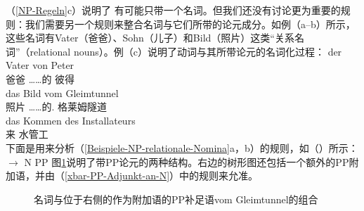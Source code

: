 （\ref{NP-Regeln}c）说明了 \nbarc 有可能只带一个名词。但我们还没有讨论更为重要的规则：我们需要另一个规则来整合名词与它们所带的论元成分。如例（a--b）所示，这些名词有Vater（爸爸）、Sohn（儿子）和Bild（照片）这类“关系名词”（relational nouns）。例（c）说明了动词与其所带论元的名词化过程：
\eal
\label{Beispiele-NP-relationale-Nomina}
\ex 
\gll der Vater von Peter\\
	  爸爸 ……的 彼得\\
\ex 
\gll das Bild vom Gleimtunnel\\
	  照片 ……的. 格莱姆隧道\\
\ex 
\gll das Kommen des Installateurs\\
	  来  水管工\\
\zl
\noindent
下面是用来分析（\ref{Beispiele-NP-relationale-Nomina}a，b）的规则，如（）所示：
\ea
\nbar $\to$ N PP
\z
%
图\ref{Abbildung-NP-mit-PP-Argument}说明了带PP论元的两种结构。右边的树形图还包括一个额外的PP附加语，并由（\ref{xbar-PP-Adjunkt-an-N}）中的规则来允准。
\begin{figure}
\caption{\label{Abbildung-NP-mit-PP-Argument}名词与位于右侧的作为附加语的PP补足语vom Gleimtunnel的组合}
\end{figure}%

